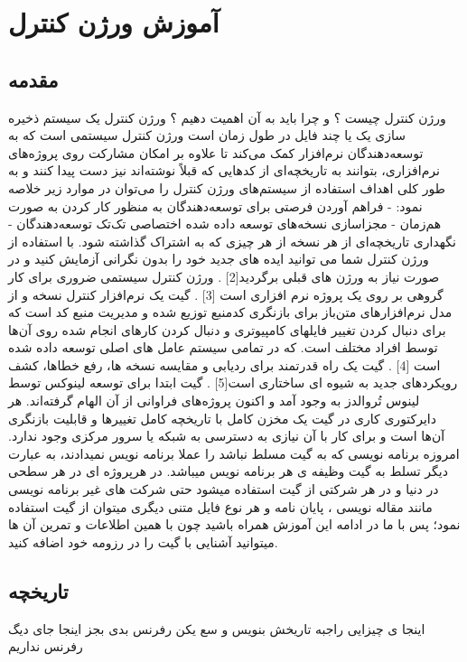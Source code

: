 \chapter{آموزش ورژن کنترل}




\section{مقدمه}
ورژن کنترل چیست ؟ و چرا باید به آن اهمیت دهیم ؟ ورژن کنترل یک سیستم ذخیره سازی یک یا چند فایل در طول زمان است \cite{Chacon2014}
ورژن کنترل سیستمی است که به توسعه‌دهندگان نرم‌افزار کمک می‌کند تا علاوه بر امکان مشارکت روی پروژه‌های نرم‌افزاری، بتوانند به تاریخچه‌ای از کدهایی که قبلاً نوشته‌اند نیز دست پیدا کنند و به طور کلی اهداف استفاده از سیستم‌های ورژن کنترل را می‌توان در موارد زیر خلاصه نمود:
- فراهم آوردن فرصتی برای توسعه‌دهندگان به منظور کار کردن به صورت هم‌زمان 
- مجزاسازی نسخه‌های توسعه داده شده اختصاصی تک‌تک توسعه‌دهندگان 
- نگهداری تاریخچه‌ای از هر نسخه از هر چیزی که به اشتراک گذاشته شود.
با استفاده از ورژن کنترل شما می توانید ایده های جدید خود را بدون نگرانی آزمایش کنید و در صورت نیاز به ورژن های قبلی برگردید[2] . ورژن کنترل سیستمی ضروری برای کار گروهی بر روی یک پروژه نرم افزاری است [3] . 
گیت یک نرم‌افزار کنترل نسخه و از مدل نرم‌افزارهای متن‌باز برای بازنگری کدمنبع توزیع شده و مدیریت منبع کد است که برای دنبال کردن تغییر فایلهای کامپیوتری و دنبال کردن کارهای انجام شده روی آن‌ها توسط افراد مختلف است. که در تمامی سیستم عامل های اصلی توسعه داده شده است [4] . گیت یک راه قدرتمند برای ردیابی و مقایسه نسخه ها، رفع خطاها، کشف رویکردهای جدید به شیوه ای ساختاری است[5] .
گیت ابتدا برای توسعه لینوکس توسط لینوس تُروالدز به وجود آمد و اکنون پروژه‌های فراوانی از آن الهام گرفته‌اند. هر دایرکتوری کاری در گیت یک مخزن کامل با تاریخچه کامل تغییرها و قابلیت بازنگری آن‌ها است و برای کار با آن نیازی به دسترسی به شبکه یا سرور مرکزی وجود ندارد.
امروزه برنامه نویسی که به گیت مسلط نباشد را عملا برنامه نویس نمیدادند، به عبارت دیگر تسلط به گیت وظیفه ی هر برنامه نویس میباشد. در هرپروژه ای در هر سطحی در دنیا و در هر شرکتی از گیت استفاده میشود حتی شرکت های غیر برنامه نویسی مانند مقاله نویسی ، پایان نامه و هر نوع فایل متنی دیگری میتوان از گیت استفاده نمود؛ پس با ما در ادامه این آموزش همراه باشید چون با همین اطلاعات و تمرین آن ها میتوانید آشنایی با گیت را در رزومه خود اضافه کنید.

\section{تاریخچه}
اینجا ی چیزایی راجبه تاریخش بنویس و سع یکن رفرنس بدی بجز اینجا جای دیگ رفرنس نداریم 
